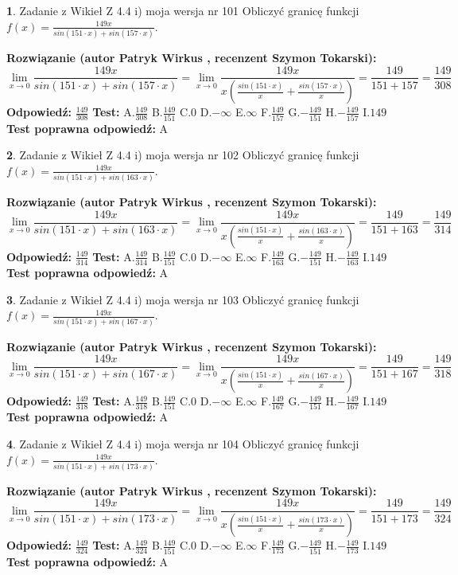 \documentclass[12pt, a4paper]{article}
\theoremstyle{definition} %
\newtheorem{zad}{}
\newcommand{\zadStart}[1]{\begin{zad}#1\newline}
\newcommand{\zadStop}{\end{zad}}
\newcommand{\rozwStart}[2]{\noindent \textbf{Rozwiązanie (autor #1 , recenzent #2): }\newline}
\newcommand{\rozwStop}{\newline}
\newcommand{\odpStart}{\noindent \textbf{Odpowiedź:}\newline}
\newcommand{\odpStop}{\newline}
\newcommand{\testStart}{\noindent \textbf{Test:}\newline}
\newcommand{\testStop}{\newline}
\newcommand{\kluczStart}{\noindent \textbf{Test poprawna odpowiedź:}\newline}
\newcommand{\kluczStop}{\newline}
\begin{document}
\zadStart{Zadanie z Wikieł Z 4.4 i) moja wersja nr 101}
Obliczyć granicę funkcji $f(x)=\frac{149x}{sin(151\cdot x) +sin(157\cdot x)}$.
\zadStop
\rozwStart{Patryk Wirkus}{Szymon Tokarski}
$$\lim\limits_{x\to 0}\frac{149x}{sin(151\cdot x) +sin(157\cdot x)}=\lim\limits_{x\to 0}\frac{149x}{x(\frac{sin(151\cdot x)}{x}+\frac{sin(157\cdot x)}{x})}=\frac{149}{151+157} = \frac{149}{308}$$
\rozwStop
\odpStart
$\frac{149}{308}$
\odpStop
\testStart
A.$\frac{149}{308}$
B.$\frac{149}{151}$
C.$0$
D.$-\infty$
E.$\infty$
F.$\frac{149}{157}$
G.$-\frac{149}{151}$
H.$-\frac{149}{157}$
I.$149$
\testStop
\kluczStart
A
\kluczStop



\zadStart{Zadanie z Wikieł Z 4.4 i) moja wersja nr 102}
Obliczyć granicę funkcji $f(x)=\frac{149x}{sin(151\cdot x) +sin(163\cdot x)}$.
\zadStop
\rozwStart{Patryk Wirkus}{Szymon Tokarski}
$$\lim\limits_{x\to 0}\frac{149x}{sin(151\cdot x) +sin(163\cdot x)}=\lim\limits_{x\to 0}\frac{149x}{x(\frac{sin(151\cdot x)}{x}+\frac{sin(163\cdot x)}{x})}=\frac{149}{151+163} = \frac{149}{314}$$
\rozwStop
\odpStart
$\frac{149}{314}$
\odpStop
\testStart
A.$\frac{149}{314}$
B.$\frac{149}{151}$
C.$0$
D.$-\infty$
E.$\infty$
F.$\frac{149}{163}$
G.$-\frac{149}{151}$
H.$-\frac{149}{163}$
I.$149$
\testStop
\kluczStart
A
\kluczStop



\zadStart{Zadanie z Wikieł Z 4.4 i) moja wersja nr 103}
Obliczyć granicę funkcji $f(x)=\frac{149x}{sin(151\cdot x) +sin(167\cdot x)}$.
\zadStop
\rozwStart{Patryk Wirkus}{Szymon Tokarski}
$$\lim\limits_{x\to 0}\frac{149x}{sin(151\cdot x) +sin(167\cdot x)}=\lim\limits_{x\to 0}\frac{149x}{x(\frac{sin(151\cdot x)}{x}+\frac{sin(167\cdot x)}{x})}=\frac{149}{151+167} = \frac{149}{318}$$
\rozwStop
\odpStart
$\frac{149}{318}$
\odpStop
\testStart
A.$\frac{149}{318}$
B.$\frac{149}{151}$
C.$0$
D.$-\infty$
E.$\infty$
F.$\frac{149}{167}$
G.$-\frac{149}{151}$
H.$-\frac{149}{167}$
I.$149$
\testStop
\kluczStart
A
\kluczStop



\zadStart{Zadanie z Wikieł Z 4.4 i) moja wersja nr 104}
Obliczyć granicę funkcji $f(x)=\frac{149x}{sin(151\cdot x) +sin(173\cdot x)}$.
\zadStop
\rozwStart{Patryk Wirkus}{Szymon Tokarski}
$$\lim\limits_{x\to 0}\frac{149x}{sin(151\cdot x) +sin(173\cdot x)}=\lim\limits_{x\to 0}\frac{149x}{x(\frac{sin(151\cdot x)}{x}+\frac{sin(173\cdot x)}{x})}=\frac{149}{151+173} = \frac{149}{324}$$
\rozwStop
\odpStart
$\frac{149}{324}$
\odpStop
\testStart
A.$\frac{149}{324}$
B.$\frac{149}{151}$
C.$0$
D.$-\infty$
E.$\infty$
F.$\frac{149}{173}$
G.$-\frac{149}{151}$
H.$-\frac{149}{173}$
I.$149$
\testStop
\kluczStart
A
\kluczStop
\end{document}
